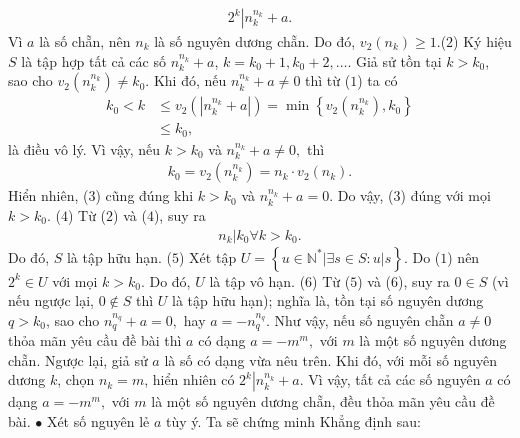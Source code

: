 \begin{multicols}{2}
\begin{align*}
		{2^k}\left| {n_k^{{n_k}} + a} \right.. \tag{$1$}
	\end{align*}
	Vì $a$ là số chẵn, nên $n_k$  là số nguyên dương chẵn. Do đó, ${v_2}\left( {{n_k}} \right) \ge 1.$\hfill   ($2$)
	\vskip 0.05cm
	Ký hiệu $S$ là tập hợp tất cả các số  $n_k^{{n_k}} + a$, \linebreak$k = {k_0} + 1,{k_0} + 2, \ldots $. 
	\vskip 0.05cm
	Giả sử tồn tại $k > k_0$, sao cho ${v_2}\left( {n_k^{{n_k}}} \right) \ne {k_0}.$  Khi đó, nếu $n_k^{{n_k}} + a \ne 0$  thì từ ($1$) ta có
	\begin{align*}
		{k_0} \!<\! k &\le {v_2}\left( {\left| {n_k^{{n_k}} \!+\! a} \right|} \right) \!=\! \min \left\{ {{v_2}\left( {n_k^{{n_k}}} \right),{k_0}} \right\} \\
		&\le {k_0},
	\end{align*}
	là điều vô lý. Vì vậy, nếu $k>k_0$  và $n_k^{{n_k}} + a \ne 0,$  thì
	\begin{align*}
		{k_0} = {v_2}\left( {n_k^{{n_k}}} \right) = {n_k} \cdot {v_2}\left( {{n_k}} \right). \tag{$3$}
	\end{align*}
	Hiển nhiên, ($3$) cũng đúng khi $k>k_0$  và  $n_k^{{n_k}} + a = 0.$ Do vậy, ($3$) đúng với mọi\linebreak $k > {k_0}.$                   \hfill ($4$)
	\vskip 0.05cm
	Từ ($2$) và ($4$), suy ra
	\begin{align*}
		{n_k}\left| {{k_0}} \right.\forall k > {k_0}.
	\end{align*}
	Do đó, $S$ là tập hữu hạn.       \hfill ($5$)
	\vskip 0.05cm
	Xét tập  $U = \left\{ {u \in \mathbb{N^*}\left| {\exists s \in S:u|s} \right.} \right\}.$
	\vskip 0.05cm
	Do ($1$) nên  $2^k \in U$ với mọi $k > k_0$.  Do đó, $U$ là tập vô hạn.                                                    \hfill             ($6$)
	\vskip 0.05cm
	Từ ($5$) và ($6$), suy ra $0 \in S$  (vì nếu ngược lại, $0 \notin S$  thì $U$ là tập hữu hạn); nghĩa là, tồn tại số nguyên dương $q > k_0$,  sao cho $n_q^{{n_q}} + a = 0,$  hay $a =  - n_q^{{n_q}}.$
	\vskip 0.05cm  
	Như vậy, nếu số nguyên chẵn $a \ne  0$ thỏa mãn yêu cầu đề bài thì $a$ có dạng $a =  - {m^m},$  với $m$ là một số nguyên dương chẵn.
	\vskip 0.05cm
	Ngược lại, giả sử $a$ là số có dạng vừa nêu trên. Khi đó, với mỗi số nguyên dương $k$, chọn  $n_k = m$, hiển nhiên có ${2^k}\left| {n_k^{{n_k}} + a} \right..$
	\vskip 0.05cm 
	Vì vậy, tất cả các số nguyên $a$ có dạng $a =  - {m^m},$  với $m$ là một số nguyên dương chẵn, đều thỏa mãn yêu cầu đề bài.
	\vskip 0.05cm
	$\bullet$ Xét số nguyên lẻ $a$ tùy ý.
	\vskip 0.05cm
	Ta sẽ chứng minh Khẳng định sau:

\end{multicols}
